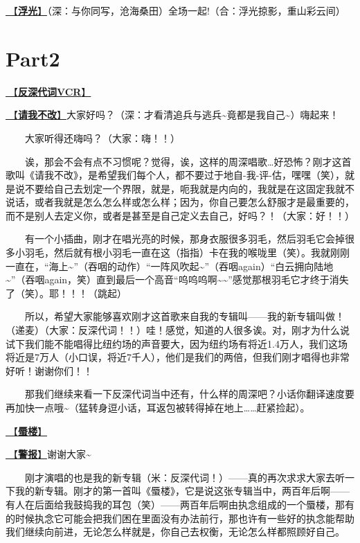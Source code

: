 \documentclass[]{ctexbook}
\begin{document}
\hyperref[floating-light]{🎵【\textbf{浮光}】}（深：与你同写，沧海桑田）全场一起!（合：浮光掠影，重山彩云间）

\section{Part2}\label{Toronto-20250314-part2}

\hyperref[senself-vcr]{🎥【\textbf{反深代词VCR}】}

\hyperref[brave-heart]{🎵【\textbf{请我不改}】}大家好吗？（深：才看清追兵与逃兵\textasciitilde 竟都是我自己\textasciitilde）嗨起来！

  大家听得还嗨吗？（大家：嗨！！）

  诶，那会不会有点不习惯呢？觉得，诶，这样的周深唱歌\ldots 好恐怖？刚才这首歌叫《请我不改》，是希望我们每个人，都不要过于地自-我-评-估，嘿嘿（笑），就是说不要给自己去划定一个界限，就是，呃我就是内向的，我就是在这固定我就不说话，或者我就是怎么怎么样或怎么样；因为，你自己要怎么舒服才是最重要的，而不是别人去定义你，或者是甚至是自己定义去自己，好吗？！（大家：好！！）

  有一个小插曲，刚才在唱光亮的时候，那身衣服很多羽毛，然后羽毛它会掉很多小羽毛，然后就有根小羽毛一直在这（指指）卡在我的喉咙里（笑）。我就刚刚一直在，``海上\textasciitilde{}''（吞咽的动作）``一阵风吹起\textasciitilde{}''（吞咽again）``白云拥向陆地\textasciitilde{}''（吞咽again，笑）直到最后一个高音``呜呜呜啊\textasciitilde\textasciitilde''感觉那根羽毛它才终于消失了（笑）。耶！！！（跳起）

  所以，希望大家能够喜欢刚才这首歌来自我的专辑叫------我的新专辑叫做！（递麦）（大家：反深代词！！）哇！感觉，知道的人很多诶。对，刚才为什么说试下我们能不能唱得比纽约场的声音要大，因为纽约场有将近1.4万人，我们这场将近是7万人（小口误，将近7千人），他们是我们的两倍，但我们刚才唱得也非常好听！谢谢你们！！

  那我们继续来看一下反深代词当中还有，什么样的周深吧？小话你翻译速度要再加快一点哦\textasciitilde（猛转身逗小话，耳返包被转得掉在地上\ldots\ldots 赶紧捡起）。

\hyperref[mirage]{🎵【\textbf{蜃楼}】}

\hyperref[the-giver]{🎵【\textbf{警报}】}谢谢大家\textasciitilde{}

  刚才演唱的也是我的新专辑（米：反深代词！）------真的再次求求大家去听一下我的新专辑。刚才的第一首叫《蜃楼》，它是说这张专辑当中，两百年后啊------有人在后面给我鼓捣我的耳包（笑）------两百年后啊由执念组成的一个蜃楼，那有的时候执念它可能会把我们困在里面没有办法前行，那也许有一些好的执念能帮助我们继续向前进，无论怎么样就是，你自己去权衡，无论怎么样都照顾好自己。
\end{document}
